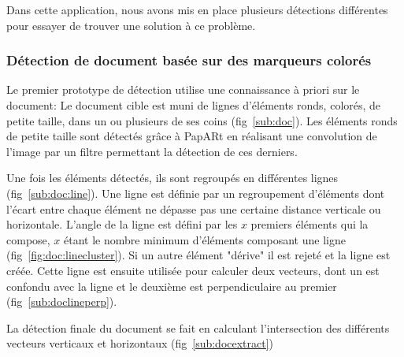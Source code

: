 Dans cette application, nous avons mis en place plusieurs détections différentes pour essayer de trouver une solution à ce problème.

\subsubsection{Détection de document basée sur des marqueurs colorés} Le premier prototype de détection utilise une connaissance à priori sur le document: Le document cible est muni de lignes d'éléments ronds, colorés, de petite taille, dans un ou plusieurs de ses coins (fig~\ref{sub:doc}). Les éléments ronds de petite taille sont détectés grâce à PapARt en réalisant une convolution de l'image par un filtre permettant la détection de ces derniers.

Une fois les éléments détectés, ils sont regroupés en différentes lignes (fig~\ref{sub:doc:line}).
Une ligne est définie par un regroupement d'éléments dont l'écart entre chaque élément ne dépasse pas une certaine distance verticale ou horizontale. L'angle de la ligne est défini par les $x$ premiers éléments qui la compose, $x$ étant le nombre minimum d'éléments composant une ligne (fig~\ref{fig:doc:linecluster}). Si un autre élément "dérive" il est rejeté et la ligne est créée. Cette ligne est ensuite utilisée pour calculer deux vecteurs, dont un est confondu avec la ligne et le deuxième est perpendiculaire au premier (fig~\ref{sub:doclineperp}).

La détection finale du document se fait en calculant l'intersection des différents vecteurs verticaux et horizontaux (fig~\ref{sub:docextract})


